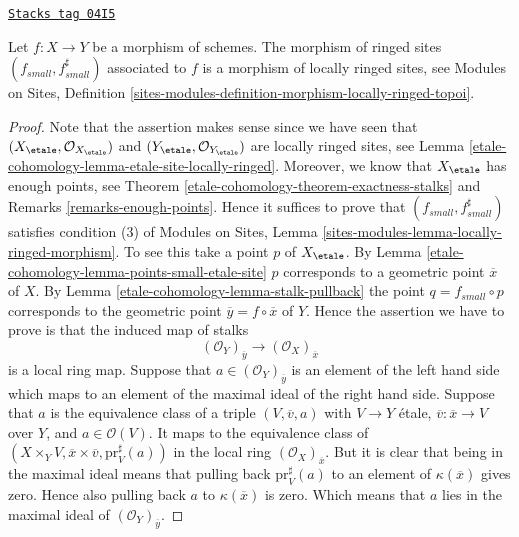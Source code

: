 \begin{lemma}
\label{etale-cohomology-lemma-morphism-locally-ringed}
\href{https://stacks.math.columbia.edu/tag/04I5}{\texttt{Stacks tag 04I5}}

Let $f : X \to Y$ be a morphism of schemes.
The morphism of ringed sites $(f_{small}, f_{small}^\sharp)$
associated to $f$ is a morphism of locally ringed sites, see
Modules on Sites,
Definition \ref{sites-modules-definition-morphism-locally-ringed-topoi}.
\end{lemma}

\begin{proof}
Note that the assertion makes sense since we have seen that
$(X_\etale, \mathcal{O}_{X_\etale})$ and
$(Y_\etale, \mathcal{O}_{Y_\etale})$
are locally ringed sites, see
Lemma \ref{etale-cohomology-lemma-etale-site-locally-ringed}.
Moreover, we know that $X_\etale$ has enough points, see
Theorem \ref{etale-cohomology-theorem-exactness-stalks}
and
Remarks \ref{remarks-enough-points}.
Hence it suffices to prove that $(f_{small}, f_{small}^\sharp)$
satisfies condition (3) of
Modules on Sites,
Lemma \ref{sites-modules-lemma-locally-ringed-morphism}.
To see this take a point $p$ of $X_\etale$. By
Lemma \ref{etale-cohomology-lemma-points-small-etale-site}
$p$ corresponds to a geometric point $\overline{x}$ of $X$.
By
Lemma \ref{etale-cohomology-lemma-stalk-pullback}
the point $q = f_{small} \circ p$ corresponds to the
geometric point $\overline{y} = f \circ \overline{x}$ of $Y$.
Hence the assertion we have to prove is that the induced map
of stalks
$$
(\mathcal{O}_Y)_{\overline{y}} \longrightarrow (\mathcal{O}_X)_{\overline{x}}
$$
is a local ring map. Suppose that $a \in (\mathcal{O}_Y)_{\overline{y}}$
is an element of the left hand side which maps to an element of the maximal
ideal of the right hand side. Suppose that $a$ is the equivalence class
of a triple $(V, \overline{v}, a)$ with $V \to Y$ \'etale,
$\overline{v} : \overline{x} \to V$ over $Y$, and $a \in \mathcal{O}(V)$.
It maps to the equivalence class of
$(X \times_Y V, \overline{x} \times \overline{v}, \text{pr}_V^\sharp(a))$
in the local ring $(\mathcal{O}_X)_{\overline{x}}$. But it is clear that
being in the maximal ideal means that pulling back $\text{pr}_V^\sharp(a)$
to an element of $\kappa(\overline{x})$ gives zero. Hence also pulling back
$a$ to $\kappa(\overline{x})$ is zero. Which means that $a$ lies in the
maximal ideal of $(\mathcal{O}_Y)_{\overline{y}}$.
\end{proof}

